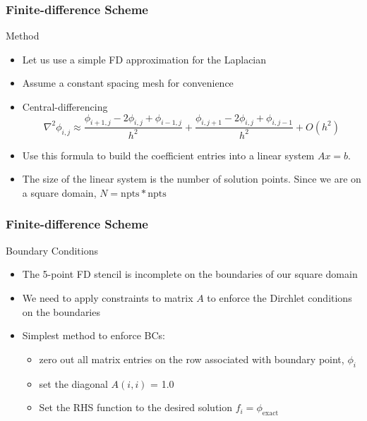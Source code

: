 \documentclass[mathserif]{beamer}
\begin{document}
\begin{frame}
  \frametitle{Finite-difference Scheme}
    \begin{block}{Method}
      \begin{itemize} 
	\item Let us use a simple FD approximation for the Laplacian
        \item Assume a constant spacing mesh for convenience
        \item Central-differencing 
	  \begin{equation}
	    \nonumber     
	    \nabla^{2}{\phi}_{i,j} \approx \frac{\phi_{i+1,j} -
	      2\phi_{i,j} + \phi_{i-1,j}}{h^2} + 
	    \frac{\phi_{i,j+1} -
	      2\phi_{i,j} + \phi_{i,j-1}}{h^2} + O(h^2)
	  \end{equation}
	  \item Use this formula to build the coefficient entries into
	    a linear system $Ax=b$.  
	  \item The size of the linear system is the number of solution
	    points. Since we are on a square domain,  $N = \text{npts}*\text{npts}$
      \end{itemize}
    \end{block}
\end{frame}

\begin{frame}
  \frametitle{Finite-difference Scheme}
    \begin{block}{Boundary Conditions}
      \begin{itemize} 
          \item The 5-point FD stencil is incomplete on the boundaries of
	    our square domain 
	  \item We need to apply constraints to matrix
	    $A$ to enforce the Dirchlet conditions on the boundaries
	  \item Simplest method to enforce BCs:
	    \begin{itemize} 
	      \item zero out all matrix entries on the
		row associated with boundary point, $\phi_i$
	    \item set the
	      diagonal $A(i,i)$ = 1.0
	      \item Set the RHS function to the
		desired solution $f_i = \phi_{\text{exact}}$
		\end{itemize}
      \end{itemize}
    \end{block}
\end{frame}
\end{document}
